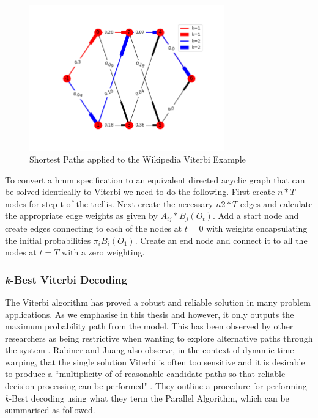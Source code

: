 {{{{{{{\begin{figure}
	\begin{center}
		\includegraphics[width=0.75\textwidth]{ch05_pyconcat/figures/wiki_hmm.png}
	\end{center}
	\caption[Shortest Paths applied to the Wikipedia Viterbi Example]{Shortest Paths applied to the Wikipedia Viterbi Example}
	\label{fig:wiki_hmm}
\end{figure}

To convert a \acrshort{hmm} specification to an equivalent directed acyclic graph that can be solved identically to Viterbi we need to do the following. First create $n*T$ nodes  for step t of the trellis. Next create the necessary $n2*T$ edges and calculate the appropriate edge weights as given by $A_{ij}*B_{j}(O_{t})$. Add a start node and create edges connecting to each of the nodes at $t=0$ with weights encapsulating the initial probabilities $\pi_{i}B_{i}(O_{1})$. Create an end node and connect it to all the nodes at $t=T$ with a zero weighting. 

\subsubsection{\textit{k}-Best Viterbi Decoding}

The Viterbi algorithm has proved a robust and reliable solution in many problem applications. As we emphasise in this thesis and \citep{Nuanain2017} however, it only outputs the maximum probability path from the model. This has been observed by other researchers as being restrictive when wanting to explore alternative paths through the system \citep{Schwarz2003, Brown2010}. Rabiner and Juang also observe, in the context of dynamic time warping, that the single solution Viterbi is often too sensitive and it is desirable to produce a ``multiplicity of of reasonable candidate paths so that reliable decision processing can be performed" \citep{Rabiner1993}. They outline a procedure for performing \textit{k}-Best decoding using what they term the Parallel Algorithm, which can be summarised as followed.



}}}}}}}
